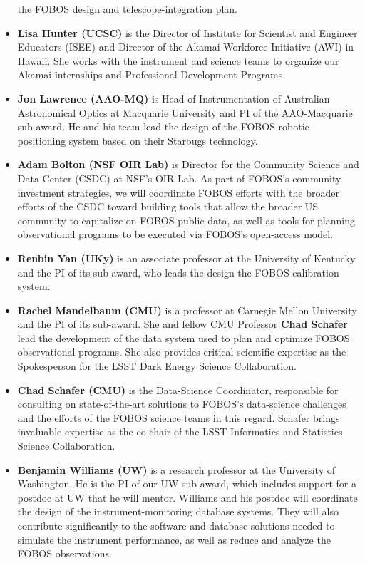 \documentclass[oneside,11pt]{amsart}
\begin{document}
\begin{itemize}
the FOBOS design and telescope-integration plan.\\[-5pt]
%
\item {\bf Lisa Hunter (UCSC)} is the Director of Institute for
Scientist and Engineer Educators (ISEE) and Director of the Akamai
Workforce Initiative (AWI) in Hawaii. She works with the instrument and
science teams to organize our Akamai internships and Professional
Development Programs.\\[-5pt]
%
\item {\bf Jon Lawrence (AAO-MQ)} is Head of Instrumentation of
Australian Astronomical Optics at Macquarie University and PI of the
AAO-Macquarie sub-award.  He and his team lead the design of the FOBOS
robotic positioning system based on their Starbugs technology.\\[-5pt]
%
\item {\bf Adam Bolton (NSF OIR Lab)} is Director for the Community
Science and Data Center (CSDC) at NSF's OIR Lab.  As part of FOBOS's
community investment strategies, we will coordinate FOBOS efforts with
the broader efforts of the CSDC toward building tools that allow the
broader US community to capitalize on FOBOS public data, as well as
tools for planning observational programs to be executed via FOBOS's
open-access model.\\[-5pt]
%
\item {\bf Renbin Yan (UKy)} is an associate professor at the University
of Kentucky and the PI of its sub-award, who leads the design the FOBOS
calibration system.\\[-5pt]
%
\item {\bf Rachel Mandelbaum (CMU)} is a professor at Carnegie Mellon
University and the PI of its sub-award. She and fellow CMU Professor
{\bf Chad Schafer} lead the development of the data system used to plan
and optimize FOBOS observational programs.  She also provides critical
scientific expertise as the Spokesperson for the LSST Dark Energy
Science Collaboration.\\[-5pt]
%
\item {\bf Chad Schafer (CMU)} is the Data-Science Coordinator,
responsible for consulting on state-of-the-art solutions to FOBOS’s
data-science challenges and the efforts of the FOBOS science teams in
this regard. Schafer brings invaluable expertise as the co-chair of the
LSST Informatics and Statistics Science Collaboration.\\[-5pt]
%
\item {\bf Benjamin Williams (UW)} is a research professor at the
University of Washington.  He is the PI of our UW sub-award, which
includes support for a postdoc at UW that he will mentor. Williams and
his postdoc will coordinate the design of the instrument-monitoring
database systems.  They will also contribute significantly to the
software and database solutions needed to simulate the instrument
performance, as well as reduce and analyze the FOBOS observations. 
%
\end{itemize}
\end{document}
